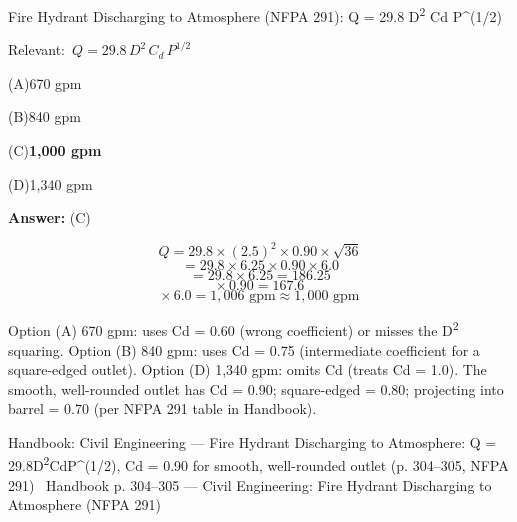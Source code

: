 \documentclass[11pt]{article}
\newcommand{\correct}[1]{\textbf{#1}\;{\color{accent}$\checkmark$}}
\newcommand{\optline}[2]{\par\noindent\hspace{1.2em}(#1)\hspace{0.6em}#2}
\begin{document}
Fire Hydrant Discharging to Atmosphere (NFPA 291):
Q = 29.8 D\textsuperscript{2} Cd P\textasciicircum{}(1/2)\par\vspace{3pt}
{\small\color{soft}Relevant:}\ $Q = 29.8\,D^2\,C_d\,P^{1/2}$\par\vspace{3pt}
\optline{A}{670 gpm}
\optline{B}{840 gpm}
\optline{C}{\correct{1,000 gpm}}
\optline{D}{1,340 gpm}
\par\vspace{3pt}
\vspace{2pt}\par\noindent\colorbox{boxbg}{\parbox{\dimexpr\linewidth-2\fboxsep\relax}{%
\vspace{2pt}\textbf{Answer:} (C)\par\vspace{2pt}
{\small \[Q = 29.8 \times (2.5)^2 \times 0.90 \times \sqrt{36}\]
\[= 29.8 \times 6.25 \times 0.90 \times 6.0\]
\[= 29.8 \times 6.25 = 186.25\]
\[\times\, 0.90 = 167.6\]
\[\times\, 6.0 = 1{,}006\text{ gpm} \approx 1{,}000\text{ gpm}\]

Option (A) 670 gpm: uses Cd = 0.60 (wrong coefficient) or misses the D\textsuperscript{2} squaring. Option (B) 840 gpm: uses Cd = 0.75 (intermediate coefficient for a square-edged outlet). Option (D) 1,340 gpm: omits Cd (treats Cd = 1.0). The smooth, well-rounded outlet has Cd = 0.90; square-edged = 0.80; projecting into barrel = 0.70 (per NFPA 291 table in Handbook).}\par\vspace{2pt}
{\footnotesize\color{soft}Handbook: Civil Engineering --- Fire Hydrant Discharging to Atmosphere: Q = 29.8D\textsuperscript{2}CdP\textasciicircum{}(1/2), Cd = 0.90 for smooth, well-rounded outlet (p. 304--305, NFPA 291) \textbullet\ Handbook p. 304--305 --- Civil Engineering: Fire Hydrant Discharging to Atmosphere (NFPA 291)}\vspace{2pt}
}}
\vspace{9pt}
\end{document}
